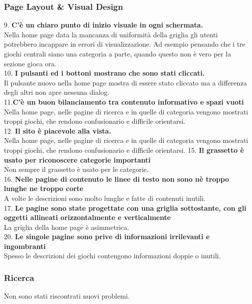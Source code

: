 \documentclass[../Report.tex]{subfiles}
\begin{document}
    \subsubsection{Page Layout \& Visual Design}
        9. \textbf{C’è un chiaro punto di inizio visuale in ogni schermata.}\\
        Nella home page data la mancanza di uniformità della griglia gli utenti potrebbero incappare in errori di visualizzazione. Ad esempio pensando che i tre giochi centrali siano una categoria a parte, quando questo non è vero per la sezione gioca ora. \\
        10. \textbf{I pulsanti ed i bottoni mostrano che sono stati cliccati.}\\
        Il pulsante nuovo nella home page mostra di essere stato cliccato ma a differenza degli altri non apre nessuna dialog.\\
        11.\textbf{C’è un buon bilanciamento tra contenuto informativo e spazi vuoti} \\
        Nella home page, nelle pagine di ricerca e in quelle di categoria vengono mostrati troppi giochi, che rendono confusionario e difficile orientarsi.\\ 
        12. \textbf{Il sito è piacevole alla vista.}\\
        Nella home page, nelle pagine di ricerca e in quelle di categoria vengono mostrati troppi giochi, che rendono confusionario e difficile orientarsi. 
        15. \textbf{Il grassetto è usato per riconoscere categorie importanti}\\
        Non sempre il grassetto è usato per le categorie. \\
        16. \textbf{Nelle pagine di contenuto le linee di testo non sono nè troppo lunghe ne troppo corte\\}
        A volte le descrizioni sono molto lunghe e fatte di contenuti inutili.\\
        17. \textbf{Le pagine sono state progettate con una griglia sottostante, con gli oggetti allineati orizzontalmente e verticalmente}\\
        La griglia della home page è asimmetrica.\\
        20. \textbf{Le singole pagine sono prive di informazioni irrilevanti e ingombranti }\\
        Spesso le descrizioni dei giochi contengono informazioni doppie o inutili.
        

    \subsubsection{Ricerca}
    Non sono stati riscontrati nuovi problemi.
\end{document}
